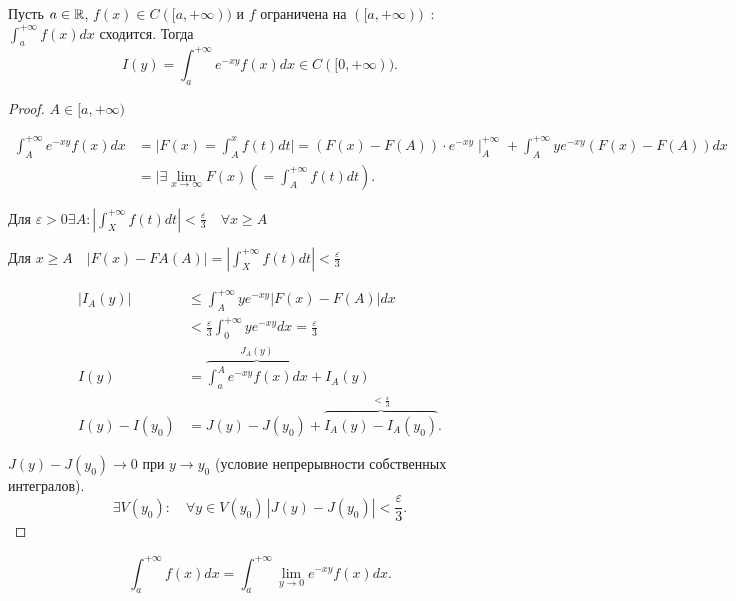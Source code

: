 \begin{lemma}
Пусть $a \in \mathbb{R}$, $f(x) \in C([a, +\infty))$ и $f$ ограничена на $([a, +\infty))$~:~~$\int_a^{+\infty } f(x) dx$ сходится.
Тогда \[I(y) = \int_a^{+\infty }e^{-xy}f(x)dx \in C([0, +\infty )).\]
\end{lemma}
\begin{proof}
    $A \in [a, +\infty)$

    \begin{align*}
        \int_A^{+\infty }e^{-xy} f(x) dx &= \Bigg| F(x) = \int_A^x f(t)dt \Bigg|  = (F(x) - F(A))\cdot e^{-xy}\mid_A^{+\infty } + \int_A^{+\infty } ye^{-xy} ( F(x) - F(A) ) dx\\
        &= \Bigg| \exists \lim_{x \to \infty} F(x) \left( = \int_A^{+\infty } f(t) dt \right).
    \end{align*}

    Для $\varepsilon >0 \exists A: \left| \int_X^{+\infty }f(t)dt \right| < \frac{\varepsilon}{3}\quad \forall x \geqslant A $

    Для $x \geqslant A\quad \left| F(x) - FA(A) \right|  = \left| \int_X^{+\infty }f(t)dt \right|< \frac{\varepsilon}{3} $

    \begin{align*}
    \left| I_A(y) \right| &\leqslant \int_A^{+\infty }ye^{-xy}\left| F(x) - F(A) \right|dx \\
    &< \frac{\varepsilon}{3}\int_0^{+\infty } ye^{-xy}dx = \frac{\varepsilon}{3}\\
    I(y) &= \overbrace{\int_a^Ae^{-xy}f(x)dx}^{J_A(y)} + I_A(y)\\
    I(y) - I(y_0) &= J(y) - J(y_0) + \overbrace{I_A(y) - I_A(y_0)}^{< \frac{\varepsilon}{3}}
    .\end{align*}

    $J(y) - J(y_0) \to 0$ при $y \to y_0$ (условие непрерывности собственных интегралов).
    \[\exists V(y_0):\quad \forall y\in V(y_0)\, \left| J(y) - J(y_0) \right|< \frac{\varepsilon}{3}. \]
\end{proof}

\begin{corollary}
    \[
    \int_a^{+\infty }f(x)dx = \int_a^{+\infty }\lim_{y \to 0} e^{-xy}f(x)dx.\]
\end{corollary}

